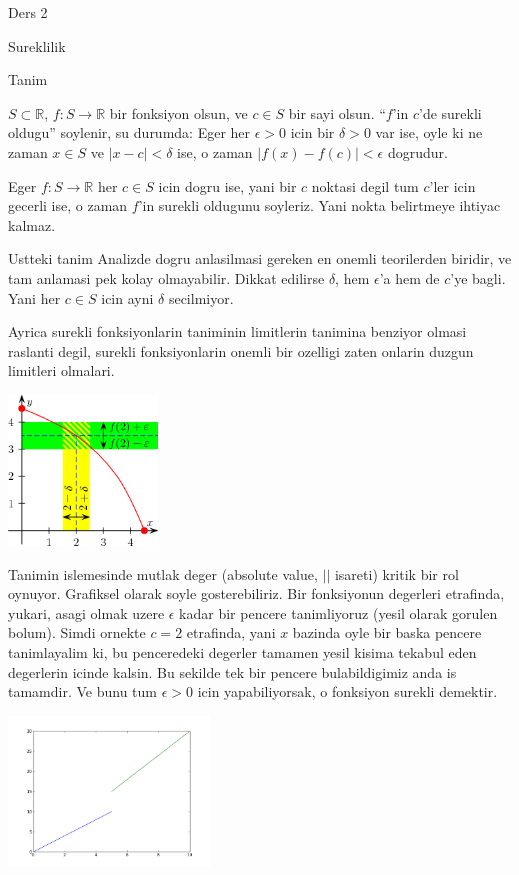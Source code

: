 \documentclass[12pt,fleqn]{article}\usepackage{../common}
\begin{document}
Ders 2

Sureklilik

Tanim

$S \subset \mathbb{R}$, $f: S \to \mathbb{R}$ bir fonksiyon olsun, ve $c
\in S$ bir sayi olsun. 
``$f$'in $c$'de surekli oldugu'' soylenir, su durumda: Eger her
$\epsilon>0$ icin bir $\delta > 0$ var ise, oyle ki ne zaman $x \in S$ ve $|x-c| < \delta$
ise, o zaman $|f(x) - f(c)| < \epsilon$ dogrudur. 

Eger  $f: S \to \mathbb{R}$ her $c \in S$ icin dogru ise, yani bir $c$
noktasi degil tum $c$'ler icin gecerli ise, o zaman $f$'in surekli oldugunu
soyleriz. Yani nokta belirtmeye ihtiyac kalmaz. 

Ustteki tanim Analizde dogru anlasilmasi gereken en onemli teorilerden
biridir, ve tam anlamasi pek kolay olmayabilir. Dikkat edilirse $\delta$,
hem $\epsilon$'a hem de $c$'ye bagli. Yani her $c \in S$ icin ayni $\delta$ secilmiyor.

Ayrica surekli fonksiyonlarin taniminin limitlerin tanimina benziyor olmasi 
raslanti degil, surekli fonksiyonlarin onemli bir ozelligi zaten onlarin
duzgun limitleri olmalari.

\includegraphics[height=4cm]{2_5.png}

Tanimin islemesinde mutlak deger (absolute value, $||$ isareti) kritik bir rol
oynuyor. Grafiksel olarak soyle gosterebiliriz. Bir fonksiyonun degerleri
etrafinda, yukari, asagi olmak uzere $\epsilon$ kadar bir pencere
tanimliyoruz (yesil olarak gorulen bolum). Simdi ornekte $c=2$ etrafinda,
yani $x$ bazinda oyle bir baska pencere tanimlayalim ki, bu penceredeki
degerler tamamen yesil kisima tekabul eden degerlerin icinde kalsin. Bu
sekilde tek bir pencere bulabildigimiz anda is tamamdir. Ve bunu tum
$\epsilon > 0$ icin yapabiliyorsak, o fonksiyon surekli demektir. 

\includegraphics[height=4cm]{2_4.png}
\end{document}
